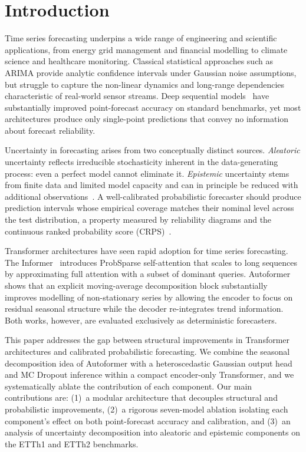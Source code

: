 \documentclass[runningheads]{llncs}
\begin{document}
\section{Introduction}

Time series forecasting underpins a wide range of engineering and scientific
applications, from energy grid management and financial modelling to climate
science and healthcare monitoring.
Classical statistical approaches such as ARIMA provide analytic confidence intervals
under Gaussian noise assumptions, but struggle to capture the non-linear dynamics
and long-range dependencies characteristic of real-world sensor streams.
Deep sequential models~\cite{hochreiter1997,vaswani2017} have substantially improved
point-forecast accuracy on standard benchmarks, yet most architectures produce only
single-point predictions that convey no information about forecast reliability.

Uncertainty in forecasting arises from two conceptually distinct sources.
\textit{Aleatoric} uncertainty reflects irreducible stochasticity inherent in the
data-generating process: even a perfect model cannot eliminate it.
\textit{Epistemic} uncertainty stems from finite data and limited model capacity
and can in principle be reduced with additional observations~\cite{gal2016}.
A well-calibrated probabilistic forecaster should produce prediction intervals whose
empirical coverage matches their nominal level across the test distribution,
a property measured by reliability diagrams and the continuous ranked probability
score (CRPS)~\cite{gneiting2007}.

Transformer architectures have seen rapid adoption for time series forecasting.
The Informer~\cite{zhou2021informer} introduces ProbSparse self-attention that scales
to long sequences by approximating full attention with a subset of dominant queries.
Autoformer~\cite{wu2021autoformer} shows that an explicit moving-average decomposition
block substantially improves modelling of non-stationary series by allowing the
encoder to focus on residual seasonal structure while the decoder re-integrates trend
information.
Both works, however, are evaluated exclusively as deterministic forecasters.

This paper addresses the gap between structural improvements in Transformer
architectures and calibrated probabilistic forecasting.
We combine the seasonal decomposition idea of Autoformer with a heteroscedastic
Gaussian output head and MC Dropout inference within a compact encoder-only
Transformer, and we systematically ablate the contribution of each component.
Our main contributions are: (1)~a modular architecture that decouples structural
and probabilistic improvements, (2)~a rigorous seven-model ablation isolating
each component's effect on both point-forecast accuracy and calibration, and
(3)~an analysis of uncertainty decomposition into aleatoric and epistemic components
on the ETTh1 and ETTh2 benchmarks.
\end{document}
